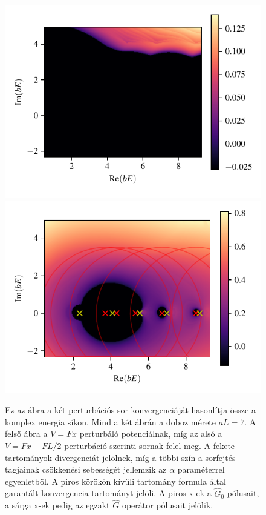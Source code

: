 \begin{figure}[H]
	\centering
	\includegraphics[scale=1]{./figs/convergenceOriginal.pdf}
	\includegraphics[scale=1]{./figs/convergenceImproved.pdf}
	\caption[A Green-függvény perturbációs sorának konvergenciatartománya]{Ez az ábra a két perturbációs sor konvergenciáját hasonlítja össze a komplex energia síkon. Mind a két ábrán a doboz mérete $aL=7$. A felső ábra a $V=Fx$ perturbáló potenciálnak, míg az alsó a $V = Fx-FL/2$ perturbáció szerinti sornak felel meg. A fekete tartományok divergenciát jelölnek, míg a többi szín a sorfejtés tagjainak csökkenési sebességét jellemzik az $\alpha$ paraméterrel  egyenletből. A piros körökön kívüli tartomány  formula által garantált konvergencia tartományt jelöli. A piros x-ek a $\hat{G}_0$ pólusait, a sárga x-ek pedig az egzakt $\hat{G}$ operátor pólusait jelölik.}
	\label{perturbation:convergencerange}
\end{figure}
